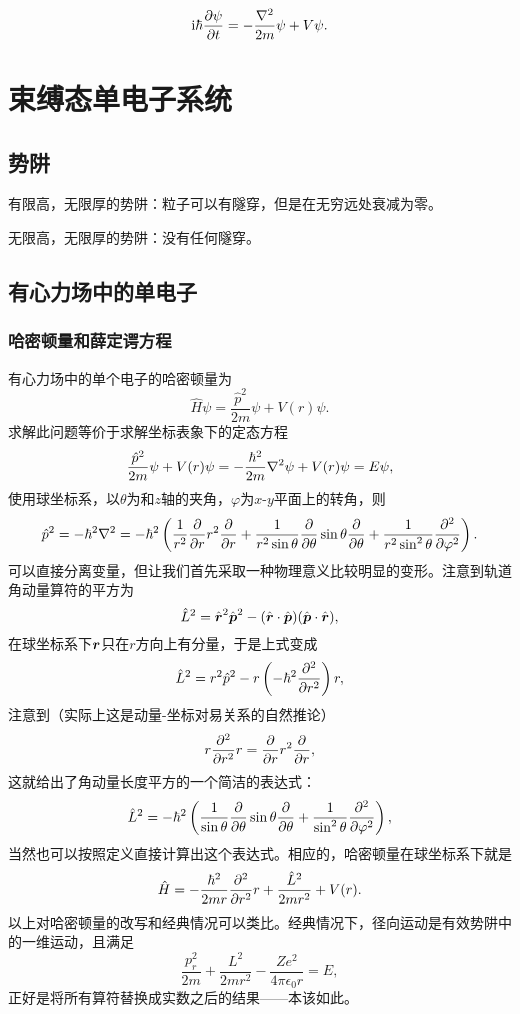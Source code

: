 \documentclass[UTF8, a4paper]{ctexart}
\newcommand*{\ii}{\mathrm{i}}
\begin{document}
\begin{equation}
    \ii \hbar \pdv{\psi}{t} = - \frac{\laplacian}{2m} \psi + V \psi.
\end{equation}

\section{束缚态单电子系统}

\subsection{势阱}

有限高，无限厚的势阱：粒子可以有隧穿，但是在无穷远处衰减为零。

无限高，无限厚的势阱：没有任何隧穿。

\subsection{有心力场中的单电子}

\subsubsection{哈密顿量和薛定谔方程}

有心力场中的单个电子的哈密顿量为
\begin{equation}
    \hat{H} \psi = \frac{\hat{p}^2}{2m} \psi + V(r) \psi.
\end{equation}
求解此问题等价于求解坐标表象下的定态方程
\begin{equation}
    \frac{\hat{p}^2}{2m} \psi + V(r) \psi = - \frac{\hbar^2}{2m} \laplacian \psi + V(r) \psi = E \psi,
    \label{eq:centered-force-eq}
\end{equation}
使用球坐标系，以$\theta$为和$z$轴的夹角，$\varphi$为$x$-$y$平面上的转角，则
\[
    \hat{p}^2 = -\hbar^2 \laplacian = - \hbar^2 \left( \frac{1}{r^2} \pdv{r} r^2 \pdv{r} + \frac{1}{r^2 \sin \theta} \pdv{\theta} \sin \theta \pdv{\theta} + \frac{1}{r^2 \sin^2 \theta} \pdv[2]{\varphi} \right) .
\]
可以直接分离变量，但让我们首先采取一种物理意义比较明显的变形。注意到轨道角动量算符的平方为
\[
    \hat{L}^2 = \hat{\vb*{r}}^2 \hat{\vb*{p}}^2 - (\hat{\vb*{r}} \cdot \hat{\vb*{p}}) (\hat{\vb*{p}} \cdot \hat{\vb*{r}}),
\]
在球坐标系下$\vb*{r}$只在$r$方向上有分量，于是上式变成
\[
    \hat{L}^2 = r^2 \hat{p}^2 - r \left( - \hbar^2 \pdv[2]{r} \right) r,
\]
注意到（实际上这是动量-坐标对易关系的自然推论）
\[
    r \pdv[2]{r} r = \pdv{r} r^2 \pdv{r},
\]
这就给出了角动量长度平方的一个简洁的表达式：
\begin{equation}
    \hat{L}^2 = - \hbar^2 \left( \frac{1}{\sin \theta} \pdv{\theta} \sin \theta \pdv{\theta} + \frac{1}{\sin^2 \theta} \pdv[2]{\varphi} \right),
\end{equation}
当然也可以按照定义直接计算出这个表达式。相应的，哈密顿量在球坐标系下就是
\[
    \hat{H} = - \frac{\hbar^2}{2 m r} \pdv[2]{r} r + \frac{\hat{L}^2}{2 m r^2} + V(r).
\]
以上对哈密顿量的改写和经典情况可以类比。经典情况下，径向运动是有效势阱中的一维运动，且满足
\[
    \frac{p_r^2}{2m} + \frac{L^2}{2mr^2} - \frac{Ze^2}{4\pi \epsilon_0 r} = E,
\]
正好是将所有算符替换成实数之后的结果——本该如此。
\end{document}
